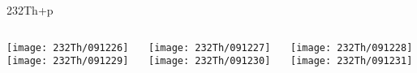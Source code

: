 \documentclass[10pt]{beamer}
\begin{document}
\begin{frame}{232Th+p}
	\begin{columns}
		\begin{column}{0.3\textwidth}
			\begin{overlayarea}{\textwidth}{\textheight}
				\centering	    
			   	\vspace{-0.1\textheight}
			   	\texttt{[image: 232Th/091226]}\\
				\vspace{0.05\textheight}		
				\texttt{[image: 232Th/091229]}
			\end{overlayarea}
		\end{column}
		\begin{column}{0.3\textwidth}
			\begin{overlayarea}{\textwidth}{\textheight}
				\centering	    
			   	\vspace{-0.1\textheight}
			   	\texttt{[image: 232Th/091227]}\\
				\vspace{0.05\textheight}				
				\texttt{[image: 232Th/091230]}
			\end{overlayarea}
		\end{column}
		\begin{column}{0.3\textwidth}
			\begin{overlayarea}{\textwidth}{\textheight}
				\centering	    
			   	\vspace{-0.1\textheight}
			   	\texttt{[image: 232Th/091228]}\\
				\vspace{0.05\textheight}				
				\texttt{[image: 232Th/091231]}
			\end{overlayarea}	
		\end{column}
	\end{columns}
\end{frame}
\end{document}
